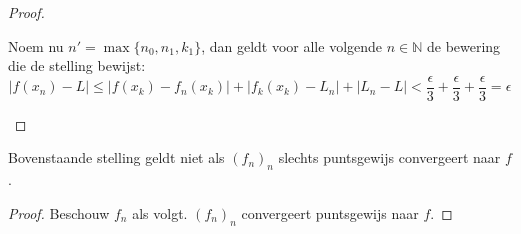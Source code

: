 \documentclass[main.tex]{subfiles}
\begin{document}
\begin{bst}
\begin{proof}
\begin{itemize}
      Noem nu $n' = \max\{n_{0},n_{1},k_{1}\}$, dan geldt voor alle volgende $n\in \mathbb{N}$ de bewering die de stelling bewijst:
      \[ |f(x_{n})-L| \le |f(x_{k}) -f_{n}(x_{k})| + |f_{k}(x_{k})-L_{n}| + |L_{n}-L| < \frac{\epsilon}{3} + \frac{\epsilon}{3} + \frac{\epsilon}{3} = \epsilon \]
    \end{itemize}
  \end{proof}
\end{bst}

\begin{tvb}
  Bovenstaande stelling geldt niet als $(f_{n})_{n}$ slechts puntsgewijs convergeert naar $f$.

  \begin{proof}
    Beschouw $f_{n}$ als volgt. $(f_{n})_{n}$ convergeert puntsgewijs naar $f$.\needed
    

\end{proof}
\end{tvb}
\end{document}
